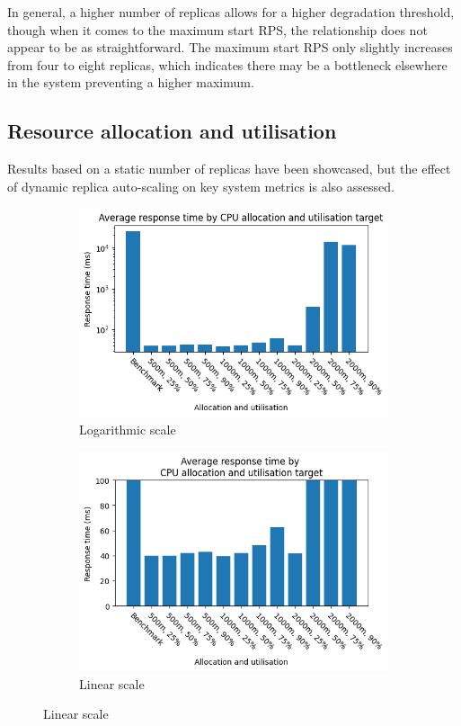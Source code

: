 In general, a higher number of replicas allows for a higher degradation threshold, though when it comes to the maximum start RPS, the relationship does not appear to be as straightforward. The maximum start RPS only slightly increases from four to eight replicas, which indicates there may be a bottleneck elsewhere in the system preventing a higher maximum.

\subsection{Resource allocation and utilisation}

Results based on a static number of replicas have been showcased, but the effect of dynamic replica auto-scaling on key system metrics is also assessed.

\begin{figure}[H]
    \centering
    \begin{subfigure}{.5\textwidth}
      \centering
      \includegraphics[width=\linewidth]{figures/uor-rau-spike-avg-response-time.png}
      \caption{Logarithmic scale}
    \end{subfigure}%
    \begin{subfigure}{.5\textwidth}
      \centering
      \includegraphics[width=\linewidth]{figures/uor-rau-spike-avg-response-time-2.png}
      \caption{Linear scale}
    \end{subfigure}


\end{figure}
